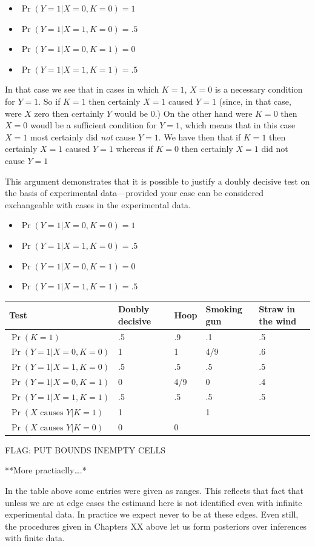\documentclass[
  12pt,
]{book}
\providecommand{\tightlist}{%
  \setlength{\itemsep}{0pt}\setlength{\parskip}{0pt}}
\begin{document}
\begin{itemize}
\tightlist
\item
  \(\Pr(Y=1|X=0, K = 0) = 1\)
\item
  \(\Pr(Y=1|X=1, K = 0) = .5\)
\item
  \(\Pr(Y=1|X=0, K = 1) = 0\)
\item
  \(\Pr(Y=1|X=1, K = 1) = .5\)
\end{itemize}

In that case we see that in cases in which \(K=1\), \(X=0\) is a necessary condition for \(Y=1\). So if \(K=1\) then certainly \(X=1\) caused \(Y=1\) (since, in that case, were \(X\) zero then certainly \(Y\) would be 0.) On the other hand were \(K=0\) then \(X=0\) woudl be a sufficient condition for \(Y=1\), which means that in this case \(X=1\) most certainly did \emph{not} cause \(Y=1\). We have then that if \(K=1\) then certainly \(X=1\) caused \(Y=1\) whereas if \(K=0\) then certainly \(X=1\) did not cause \(Y=1\)

This argument demonstrates that it is possible to justify a doubly decisive test on the basis of experimental data---provided your case can be considered exchangeable with cases in the experimental data.

\begin{itemize}
\tightlist
\item
  \(\Pr(Y=1|X=0, K = 0) = 1\)
\item
  \(\Pr(Y=1|X=1, K = 0) = .5\)
\item
  \(\Pr(Y=1|X=0, K = 1) = 0\)
\item
  \(\Pr(Y=1|X=1, K = 1) = .5\)
\end{itemize}

\begin{longtable}[]{@{}lllll@{}}
\toprule
Test & Doubly decisive & Hoop & Smoking gun & Straw in the wind\tabularnewline
\midrule
\endhead
\(\Pr(K = 1)\) & .5 & .9 & .1 & .5\tabularnewline
\(\Pr(Y=1|X=0, K = 0)\) & 1 & 1 & 4/9 & .6\tabularnewline
\(\Pr(Y=1|X=1, K = 0)\) & .5 & .5 & .5 & .5\tabularnewline
\(\Pr(Y=1|X=0, K = 1)\) & 0 & 4/9 & 0 & .4\tabularnewline
\(\Pr(Y=1|X=1, K = 1)\) & .5 & .5 & .5 & .5\tabularnewline
\(\Pr(X \text{  causes }Y|K=1)\) & 1 & & 1 &\tabularnewline
\(\Pr(X \text{  causes }Y|K=0)\) & 0 & 0 & &\tabularnewline
\bottomrule
\end{longtable}

FLAG: PUT BOUNDS INEMPTY CELLS

**More practiaclly\ldots.*

In the table above some entries were given as ranges. This reflects that fact that unless we are at edge cases the estimand here is not identified even with infinite experimental data. In practice we expect never to be at these edges. Even still, the procedures given in Chapters XX above let us form posteriors over inferences with finite data.
\end{document}
